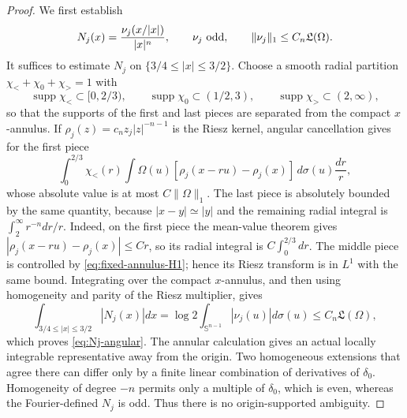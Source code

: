 \documentclass[11pt]{article}
\numberwithin{equation}{section}
\theoremstyle{remark}
\theoremstyle{definition}
\newcommand{\Sph}{\mathbb S}
\newcommand{\supp}{\operatorname{supp}}
\newcommand{\norm}[1]{\lVert #1\rVert}
\begin{document}
\begin{proof}
We first establish
\begin{equation}\label{eq:Nj-angular}
 N_j(x)=\frac{\nu_j(x/|x|)}{|x|^n},\qquad
 \nu_j\ \hbox{odd},\qquad
 \norm{\nu_j}_1\le C_n\mathfrak L(\Omega).
\end{equation}
It suffices to estimate $N_j$ on $\{3/4\le|x|\le3/2\}$.  Choose a smooth
radial partition $\chi_<+\chi_0+\chi_>=1$ with
\[
 \supp\chi_<\subset[0,2/3),\qquad
 \supp\chi_0\subset(1/2,3),\qquad
 \supp\chi_>\subset(2,\infty),
\]
so that the supports of the first and last pieces are separated from the
compact $x$-annulus.
If
$\rho_j(z)=c_nz_j|z|^{-n-1}$ is the Riesz kernel, angular cancellation gives
for the first piece
\[
 \int_0^{2/3}\chi_<(r)\int\Omega(u)
 [\rho_j(x-ru)-\rho_j(x)]\,d\sigma(u)\frac{dr}{r},
\]
whose absolute value is at most $C\norm\Omega_1$.  The last piece is
absolutely bounded by the same quantity, because $|x-y|\simeq|y|$ and the
remaining radial integral is $\int_2^\infty r^{-n}dr/r$.  Indeed, on the
first piece the mean-value theorem gives
$|\rho_j(x-ru)-\rho_j(x)|\le Cr$, so its radial integral is
$C\int_0^{2/3}dr$.  The middle piece is
controlled by \eqref{eq:fixed-annulus-H1}; hence its Riesz transform is in
$L^1$ with the same bound.  Integrating over the compact $x$-annulus, and
then using homogeneity and parity of the Riesz multiplier, gives
\[
 \int_{3/4\le|x|\le3/2}|N_j(x)|dx
 =\log2\int_{\Sph^{n-1}}|\nu_j(u)|d\sigma(u)
 \le C_n\mathfrak L(\Omega),
\]
which proves \eqref{eq:Nj-angular}.  The annular calculation gives an actual locally
integrable representative away from the origin.  Two homogeneous
extensions that agree there can differ only by a finite linear combination
of derivatives of $\delta_0$.  Homogeneity of degree $-n$ permits only a
multiple of $\delta_0$, which is even, whereas the Fourier-defined $N_j$
is odd.  Thus there is no origin-supported ambiguity.


\end{proof}
\end{document}
